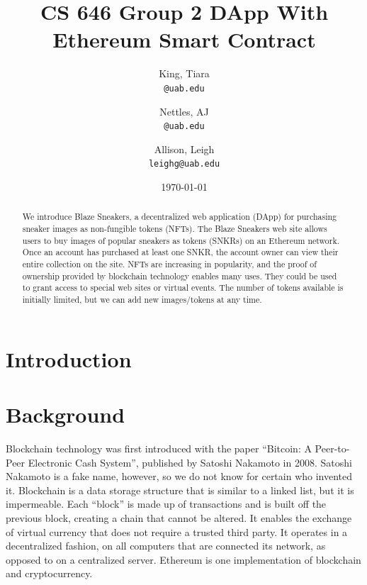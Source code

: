 \documentclass{article}
\begin{document}
\title{CS 646 Group 2 DApp With Ethereum Smart Contract}
\date{\today}

\author{
  King, Tiara\\
  \texttt{@uab.edu}
  \and
  Nettles, AJ\\
  \texttt{@uab.edu}
  \and
  Allison, Leigh\\
  \texttt{leighg@uab.edu}
}
\maketitle

\begin{abstract}
\noindent
    We introduce Blaze Sneakers, a decentralized web application (DApp) for purchasing sneaker images as non-fungible tokens (NFTs).
    The Blaze Sneakers web site allows users to buy images of popular sneakers as tokens (SNKRs) on an Ethereum network.
    Once an account has purchased at least one SNKR, the account owner can view their entire collection on the site.
    NFTs are increasing in popularity, and the proof of ownership provided by blockchain technology enables many uses.
    They could be used to grant access to special web sites or virtual events.
    The number of tokens available is initially limited, but we can add new images/tokens at any time.
\end{abstract}


\section{Introduction}

\section{Background}
    Blockchain technology was first introduced with the paper ``Bitcoin: A Peer-to-Peer Electronic Cash System'', 
    published by Satoshi Nakamoto in 2008.
    Satoshi Nakamoto is a fake name, however, so we do not know for certain who invented it.
    Blockchain is a data storage structure that is similar to a linked list, but it is impermeable.
    Each ``block'' is made up of transactions and is built off the previous block, creating a chain that cannot be altered.
    It enables the exchange of virtual currency that does not require a trusted third party.
    It operates in a decentralized fashion, on all computers that are connected its network, 
    as opposed to on a centralized server.
    Ethereum is one implementation of blockchain and cryptocurrency.
\end{document}
